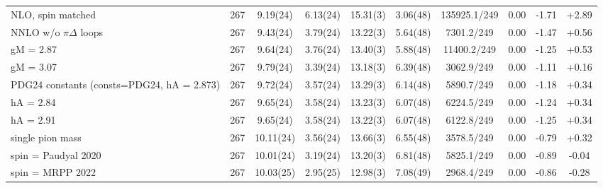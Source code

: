 \begin{tabular}{lccccccccc}
NLO, spin matched & 267 & 9.19(24) & 6.13(24) & 15.31(3) & 3.06(48) & 135925.1/249 & 0.00 & -1.71 & +2.89 \\
NNLO w/o $\pi\Delta$ loops & 267 & 9.43(24) & 3.79(24) & 13.22(3) & 5.64(48) & 7301.2/249 & 0.00 & -1.47 & +0.56 \\
gM = 2.87 & 267 & 9.64(24) & 3.76(24) & 13.40(3) & 5.88(48) & 11400.2/249 & 0.00 & -1.25 & +0.53 \\
gM = 3.07 & 267 & 9.79(24) & 3.39(24) & 13.18(3) & 6.39(48) & 3062.9/249 & 0.00 & -1.11 & +0.16 \\
PDG24 constants (consts=PDG24, hA = 2.873) & 267 & 9.72(24) & 3.57(24) & 13.29(3) & 6.14(48) & 5890.7/249 & 0.00 & -1.18 & +0.34 \\
hA = 2.84 & 267 & 9.65(24) & 3.58(24) & 13.23(3) & 6.07(48) & 6224.5/249 & 0.00 & -1.24 & +0.34 \\
hA = 2.91 & 267 & 9.65(24) & 3.58(24) & 13.22(3) & 6.07(48) & 6122.8/249 & 0.00 & -1.25 & +0.34 \\
single pion mass & 267 & 10.11(24) & 3.56(24) & 13.66(3) & 6.55(48) & 3578.5/249 & 0.00 & -0.79 & +0.32 \\
spin = Paudyal 2020 & 267 & 10.01(24) & 3.19(24) & 13.20(3) & 6.81(48) & 5825.1/249 & 0.00 & -0.89 & -0.04 \\
spin = MRPP 2022 & 267 & 10.03(25) & 2.95(25) & 12.98(3) & 7.08(49) & 2968.4/249 & 0.00 & -0.86 & -0.28 \\
\hline
\end{tabular}

